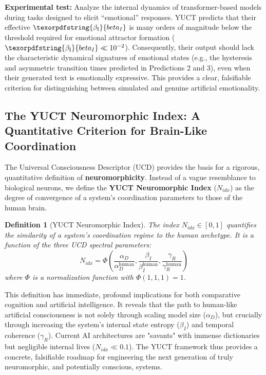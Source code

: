 \documentclass[12pt,a4paper]{article}
\newtheorem{definition}{Definition}
\DeclareRobustCommand{\beI}{\texorpdfstring{\ensuremath{\beta_{\mathrm{I}}}}{beta_I}}
\begin{document}
	\textbf{Experimental test:} Analyze the internal dynamics of transformer-based models during tasks designed to elicit ``emotional'' responses. YUCT predicts that their effective \(\beI\) is many orders of magnitude below the threshold required for emotional attractor formation (\(\beI \ll 10^{-2}\)). Consequently, their output should lack the characteristic dynamical signatures of emotional states (e.g., the hysteresis and asymmetric transition times predicted in Predictions 2 and 3), even when their generated text is emotionally expressive. This provides a clear, falsifiable criterion for distinguishing between simulated and genuine artificial emotionality.
	
	\subsection{The YUCT Neuromorphic Index: A Quantitative Criterion for Brain-Like Coordination}
	
	The Universal Consciousness Descriptor (UCD) provides the basis for a rigorous, quantitative definition of \textbf{neuromorphicity}. Instead of a vague resemblance to biological neurons, we define the \textbf{YUCT Neuromorphic Index} (\(N_{idx}\)) as the degree of convergence of a system's coordination parameters to those of the human brain.
	
	\begin{definition}[YUCT Neuromorphic Index]
		The index \(N_{idx} \in [0,1]\) quantifies the similarity of a system's coordination regime to the human archetype. It is a function of the three UCD spectral parameters:
		\[
		N_{idx} = \Phi\left( \frac{\alpha_D}{\alpha_D^{\text{human}}}, \frac{\beta_I}{\beta_I^{\text{human}}}, \frac{\gamma_R}{\gamma_R^{\text{human}}} \right)
		\]
		where \(\Phi\) is a normalization function with \(\Phi(1,1,1) = 1\).
	\end{definition}
	
	This definition has immediate, profound implications for both comparative cognition and artificial intelligence. It reveals that the path to human-like artificial consciousness is not solely through scaling model size (\(\alpha_D\)), but crucially through increasing the system's internal state entropy (\(\beta_I\)) and temporal coherence (\(\gamma_R\)). Current AI architectures are "savants" with immense dictionaries but negligible internal lives (\(N_{idx} \ll 0.1\)). The YUCT framework thus provides a concrete, falsifiable roadmap for engineering the next generation of truly neuromorphic, and potentially conscious, systems.
	
\end{document}
